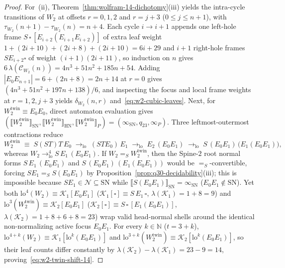 \documentclass[11pt,reqno]{amsart}
\numberwithin{equation}{section}
\theoremstyle{plain}
\theoremstyle{definition}
\theoremstyle{remark}
\newcommand{\SN}{\mathrm{SN}}
\newcommand{\HN}{\mathrm{HN}}
\newcommand{\sem}[1]{\llbracket #1 \rrbracket}
\newcommand{\convS}{=_S}
\begin{document}
\begin{proof}
For~(ii), Theorem~\ref{thm:wolfram-14-dichotomy}(iii) yields the intra-cycle transitions of $W_2$ at offsets $r = 0, 1, 2$ and $r = j + 3$ ($0 \le j \le n + 1$), with $\tau_{W_2}(n+1) - \tau_{W_2}(n) = n + 4$. Each cycle $i \to i + 1$ appends one left-hole frame $S\,\square\,[E_{i+2}(E_{i+1} E_{i+2})]$ of extra leaf weight $1 + (2i + 10) + (2i + 8) + (2i + 10) = 6i + 29$ and $i + 1$ right-hole frames $S E_{i+2} \square$ of weight $(i + 1)(2i + 11)$, so induction on $n$ gives $6\,\lambda(\mathcal{C}_{W_2}(n)) = 4n^3 + 51n^2 + 185n + 54$. Adding $|E_0 E_{n+1}| = 6 + (2n + 8) = 2n + 14$ at $r = 0$ gives $(4n^3 + 51n^2 + 197n + 138)/6$, and inspecting the focus and local frame weights at $r = 1, 2, j + 3$ yields $\delta_{W_2}(n, r)$ and~\eqref{eq:w2-cubic-leaves}. Next, for $W_2^{\mathrm{twin}} \equiv E_0 E_0$, direct automaton evaluation gives $(\sem{W_2^{\mathrm{twin}}}_{\SN}, \sem{W_2^{\mathrm{twin}}}_{\HN}, \sem{W_2^{\mathrm{twin}}}_P) = (\infty_{\SN}, q_{23}, \infty_P)$. Three leftmost-outermost contractions reduce
\[
W_2^{\mathrm{twin}} \;\equiv\; S(S T)T\,E_0
\;\longrightarrow_{\mathrm{lo}}\; (S T E_0)\,E_1
\;\longrightarrow_{\mathrm{lo}}\; E_2\,(E_0 E_1)
\;\longrightarrow_{\mathrm{lo}}\; S\,(E_0 E_1)\,\bigl(E_1(E_0 E_1)\bigr),
\]
whereas $W_2 \to_{\mathrm{lo}}^4 S\,E_1\,(E_0 E_1)$. If $W_2 \convS W_2^{\mathrm{twin}}$, then the Spine-$2$ root normal forms $S\,E_1\,(E_0 E_1)$ and $S\,(E_0 E_1)\,(E_1(E_0 E_1))$ would be $\convS$-convertible, forcing $S E_1 \convS S(E_0 E_1)$ by Proposition~\ref{prop:q30-decidability}(iii); this is impossible because $S E_1 \in \mathcal{N} \subseteq \SN$ while $\sem{S(E_0 E_1)}_{\SN} = \infty_{\SN}$ ($E_0 E_1 \notin \SN$). Yet both $\mathrm{lo}^4(W_2) \equiv \mathcal{K}_1[E_0 E_1]$ ($\mathcal{K}_1[\square] \equiv S\,E_1\,\square$, $\lambda(\mathcal{K}_1) = 1 + 8 = 9$) and $\mathrm{lo}^3(W_2^{\mathrm{twin}}) \equiv \mathcal{K}_2[E_0 E_1]$ ($\mathcal{K}_2[\square] \equiv S\,\square\,[E_1(E_0 E_1)]$, $\lambda(\mathcal{K}_2) = 1 + 8 + 6 + 8 = 23$) wrap valid head-normal shells around the identical non-normalizing active focus $E_0 E_1$. For every $k \in \mathbb{N}$ ($t = 3 + k$), $\mathrm{lo}^{4+k}(W_2) \equiv \mathcal{K}_1[\mathrm{lo}^k(E_0 E_1)]$ and $\mathrm{lo}^{3+k}(W_2^{\mathrm{twin}}) \equiv \mathcal{K}_2[\mathrm{lo}^k(E_0 E_1)]$, so their leaf counts differ constantly by $\lambda(\mathcal{K}_2) - \lambda(\mathcal{K}_1) = 23 - 9 = 14$, proving~\eqref{eq:w2-twin-shift-14}.


\end{proof}
\end{document}
